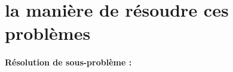 \section{la manière de résoudre ces problèmes}



 \paragraph{Résolution de sous-problème :}




















